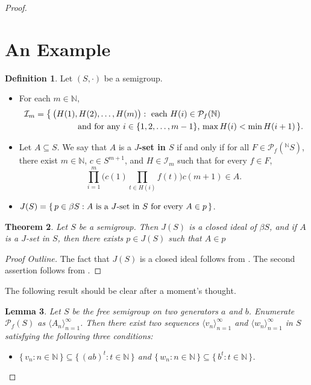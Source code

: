 \documentclass[12pt]{article}
\theoremstyle{plain}
\newtheorem{thm}{Theorem}[section]
\newtheorem{lem}[thm]{Lemma}
\theoremstyle{definition}
\newtheorem{defn}[thm]{Definition}
\newcommand{\la}{\langle}
\newcommand{\ra}{\rangle}
\begin{document}
\begin{proof}
\section{An Example}
 \begin{defn}
  Let $(S,\cdot)$ be a semigroup.
    \begin{itemize}
    \item[(a)] For each $m \in \mathbb{N}$,
      \begin{align*}
      \mathcal{I}_m = \bigl\{\,\bigl(H(1) &, H(2), \ldots, 
      H(m)\bigr) : \hbox{ each $H(i) \in 
      \mathcal{P}_f(\mathbb{N})$} \\ 
      & \hbox{ and for any $i \in \{1, 2,\ldots, m-1\}$, 
      $\max H(i) < \min H(i+1)$} \,\}.
      \end{align*}

    \item[(b)] Let $A \subseteq S$.
      We say that $A$ is a \textbf{$J$-set in $S$} if and only if
      for all $F \in \mathcal{P}_f(^{\mathbb{N}}{\!S})$, there exist
      $m \in \mathbb{N}$, $c \in S^{m+1}$, and $H \in \mathcal{I}_m$
      such that for every $f \in F$,
      \[
      \prod_{i=1}^m\bigl(c(1) \prod_{t \in H(i)} f(t)\bigr)c(m+1) \in
      A.
      \]

    \item[(c)] $J(S) = \{\, p \in \beta S : \hbox{$A$ is a 
      $J$-set in $S$ for every $A \in p$} \,\}$.
    \end{itemize}
  \end{defn}

  \begin{thm}
  Let $S$ be a semigroup.
  Then $J(S)$ is a closed ideal of $\beta S$, and if $A$ is 
  a $J$-set in $S$, then there exists $p \in J(S)$ such that
  $A \in p$
  \end{thm}
  \begin{proof}[Proof Outline]
  The fact that $J(S)$ is a closed ideal follows from 
  \cite[Theorem 3.5]{NewCST}.
  The second assertion follows from \cite[Theorem 2.14]{CarProdCST}.
  \end{proof}

The following result should be clear after a moment's thought.

  \begin{lem}\label{lem:seqs}
  Let $S$ be the free semigroup on two generators $a$ and $b$.
  Enumerate $\mathcal{P}_f(S)$ as $\la A_n \ra_{n=1}^\infty$. 
   Then there exist two sequences $\la v_n \ra_{n=1}^\infty$ and 
  $\la w_n \ra_{n=1}^\infty$ in $S$ satisfying the following 
  three conditions:
    \begin{itemize}
    \item[(1)] $\{\, v_n : n \in \mathbb{N} \,\} \subseteq
      \{\, (ab)^t : t \in \mathbb{N} \,\}$ and $\{\, w_n :
      n \in \mathbb{N} \,\} \subseteq \{\, b^t : t \in \mathbb{N} 
      \,\}$.


\end{itemize}
\end{lem}
\end{proof}
\end{document}
